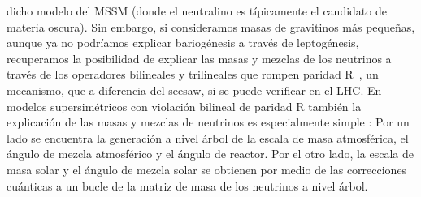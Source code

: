 dicho modelo del MSSM (donde el neutralino es típicamente el candidato de materia
oscura). Sin embargo, si consideramos masas de gravitinos más
pequeñas, aunque ya no podríamos explicar bariogénesis a través de
leptogénesis, recuperamos la posibilidad de explicar las masas y
mezclas de los neutrinos a través de los operadores bilineales y
trilineales que rompen paridad R~\cite{Hirsch:2005ag}, un mecanismo,
que a diferencia del seesaw, si se puede verificar en el LHC.
En modelos supersimétricos con violación bilineal de paridad R también
la explicación de las masas y mezclas de neutrinos es especialmente
simple \cite{Hirsch:2000ef,Diaz:2003as,Hirsch:2004he,Hirsch:2008ur}: Por un lado se encuentra la
generación a nivel árbol de la escala de masa atmosférica, el ángulo
de mezcla atmosférico y el ángulo de reactor. Por el otro lado, la
escala de masa solar y el ángulo de mezcla solar se obtienen por medio
de las correcciones cuánticas a un bucle de la matriz de masa de los
neutrinos a nivel árbol.

